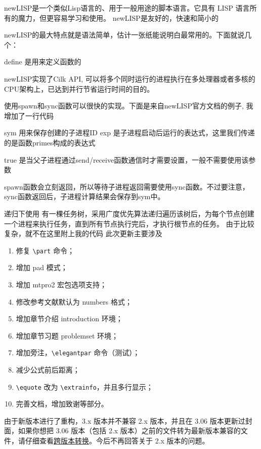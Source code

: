 \documentclass[cn,11pt]{elegantbook}
\begin{document}
newLISP是一个类似Lisp语言的、用于一般用途的脚本语言。它具有 LISP 语言所有的魔力，但更容易学习和使用。
newLISP是友好的，快速和简小的

newLISP的最大特点就是语法简单，估计一张纸能说明白最常用的。下面就说几个：

define 是用来定义函数的

newLISP实现了Cilk API, 可以将多个同时运行的进程执行在多处理器或者多核的CPU架构上，已达到并行节省运行时间的目的。

使用spawn和sync函数可以很快的实现。下面是来自newLISP官方文档的例子, 我增加了一行代码

sym 用来保存创建的子进程ID
exp 是子进程启动后运行的表达式，这里我们传递的是函数primes构成的表达式

true 是当父子进程通过send/receive函数通信时才需要设置，一般不需要使用该参数

spawn函数会立刻返回，所以等待子进程返回需要使用sync函数。不过要注意，sync函数返回后，子进程计算结果会保存到sym中。


递归下使用
有一棵任务树，采用广度优先算法递归遍历该树后，为每个节点创建一个进程来执行任务，直到所有节点执行完后，才执行根节点的任务。
由于比较复杂，就不在这里附上我的代码
此次更新主要涉及
\begin{enumerate}
\item 修复 \lstinline|\part| 命令；
\item 增加 pad 模式；
\item 增加 mtpro2 宏包选项支持；
\item 修改参考文献默认为 numbers 格式；
\item 增加章节介绍 introduction 环境；
\item 增加章节习题 problemset 环境；
\item 增加旁注，\lstinline{\elegantpar} 命令（测试）；
\item 减少公式前后距离；
\item \lstinline{\equote} 改为 \lstinline{\extrainfo}，并且多行显示；
\item 完善文档，增加致谢等部分。
\end{enumerate}

\begin{note}
由于新版本进行了重构，3.x 版本并不兼容 2.x 版本，并且在 3.06 版本更新过封面，如果你想把 3.06 版本（包括 2.x 版本）之前的文件转为最新版本兼容的文件，请仔细查看\href{https://github.com/ElegantLaTeX/ElegantBook/wiki/convert}{跨版本转换}。今后不再回答关于 2.x 版本的问题。
\end{note}
\end{document}
